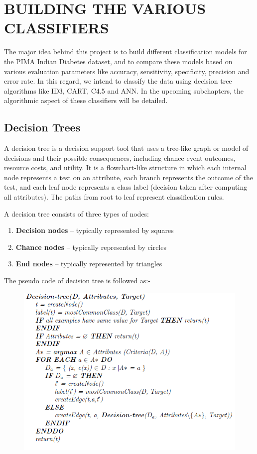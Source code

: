 \chapter{BUILDING THE VARIOUS CLASSIFIERS}
The major idea behind this project is to build different classification models for the PIMA Indian Diabetes dataset, and to compare these models based on various evaluation parameters like accuracy, sensitivity, specificity, precision and error rate. In this regard, we intend to classify the data using decision tree algorithms like ID3, CART, C4.5 and ANN.
In the upcoming subchapters, the algorithmic aspect of these classifiers will be detailed.

\section{Decision Trees}
A decision tree is a decision support tool that uses a tree-like graph or model of decisions and their possible consequences, including chance event outcomes, resource costs, and utility. It is a flowchart-like structure in which each internal node represents a test on an attribute, each branch represents the outcome of the test, and each leaf node represents a class label (decision taken after computing all attributes). The paths from root to leaf represent classification rules.

A decision tree consists of three types of nodes:
\begin{enumerate}
    \item \textbf{Decision nodes} – typically represented by squares
    \item \textbf{Chance nodes} – typically represented by circles
    \item \textbf{End nodes} – typically represented by triangles
\end{enumerate}

The pseudo code of decision tree is followed as:-

\begin{figure}[h]
\centering %
\includegraphics[scale=0.97]{dtcode.png}
\end{figure}
\pagebreak

